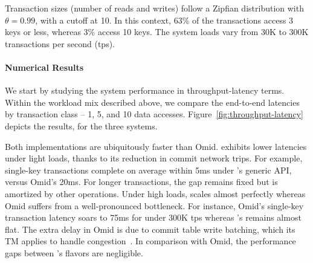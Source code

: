 Transaction sizes (number of reads and writes) follow a Zipfian distribution with $\theta=0.99$, with a cutoff at 10. 
In this context, 63\% of the transactions access 3 keys or less, whereas 3\% access 10 keys. The system loads
vary from 30K to 300K transactions per second (tps). 

\paragraph{Numerical Results} We start by studying the system performance in throughput-latency terms. 
Within the workload mix described above, we compare the end-to-end latencies by transaction class -- 
1, 5, and 10 data accesses. Figure~\ref{fig:throughput-latency} depicts the results, for the three systems. 

Both {\sys\/} implementations are ubiquitously faster than Omid. {\sys\/} exhibits lower latencies under light loads, 
thanks to its reduction in commit network trips. For example, single-key transactions complete on average within 
5ms under {\sys}'s generic API, versus Omid's 20ms. For longer transactions, the gap remains fixed but is amortized 
by other operations. Under high loads, {\sys\/} scales almost perfectly whereas Omid suffers from a well-pronounced 
bottleneck. For instance, Omid's single-key transaction latency soars to 75ms for under 300K tps whereas
{\sys}'s remains almost flat. The extra delay in Omid is due to commit table write batching, which its TM applies 
to handle congestion~\cite{Omid2017}. In comparison with Omid, the performance gaps between {\sys}'s flavors 
are negligible. 








